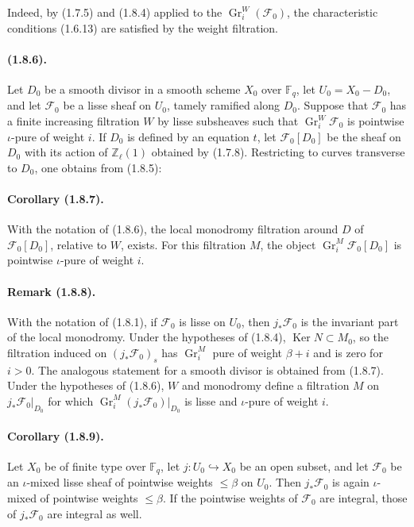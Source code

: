 \documentclass[11pt]{article}
\theoremstyle{remark}
\newcommand{\Fq}{\mathbb{F}_q}
\newcommand{\Gr}{\operatorname{Gr}}
\newcommand{\Ker}{\operatorname{Ker}}
\begin{document}
Indeed, by (1.7.5) and (1.8.4) applied to the $\Gr^W_i(\mathcal F_0)$, the characteristic conditions (1.6.13) are satisfied by the weight filtration.

\paragraph{(1.8.6).} Let $D_0$ be a smooth divisor in a smooth scheme $X_0$ over $\Fq$, let $U_0=X_0-D_0$, and let $\mathcal F_0$ be a lisse sheaf on $U_0$, tamely ramified along $D_0$. Suppose that $\mathcal F_0$ has a finite increasing filtration $W$ by lisse subsheaves such that $\Gr^W_i\mathcal F_0$ is pointwise $\iota$-pure of weight $i$. If $D_0$ is defined by an equation $t$, let $\mathcal F_0[D_0]$ be the sheaf on $D_0$ with its action of $\mathbb Z_\ell(1)$ obtained by (1.7.8). Restricting to curves transverse to $D_0$, one obtains from (1.8.5):

\paragraph{Corollary (1.8.7).} With the notation of (1.8.6), the local monodromy filtration around $D$ of $\mathcal F_0[D_0]$, relative to $W$, exists. For this filtration $M$, the object $\Gr^M_i\mathcal F_0[D_0]$ is pointwise $\iota$-pure of weight $i$.

\paragraph{Remark (1.8.8).} With the notation of (1.8.1), if $\mathcal F_0$ is lisse on $U_0$, then $j_*\mathcal F_0$ is the invariant part of the local monodromy. Under the hypotheses of (1.8.4), $\Ker N\subset M_0$, so the filtration induced on $(j_*\mathcal F_0)_s$ has $\Gr^M_i$ pure of weight $\beta+i$ and is zero for $i>0$. The analogous statement for a smooth divisor is obtained from (1.8.7). Under the hypotheses of (1.8.6), $W$ and monodromy define a filtration $M$ on $j_*\mathcal F_0|_{D_0}$ for which $\Gr^M_i(j_*\mathcal F_0)|_{D_0}$ is lisse and $\iota$-pure of weight $i$.

\paragraph{Corollary (1.8.9).} Let $X_0$ be of finite type over $\Fq$, let $j:U_0\hookrightarrow X_0$ be an open subset, and let $\mathcal F_0$ be an $\iota$-mixed lisse sheaf of pointwise weights $\le \beta$ on $U_0$. Then $j_*\mathcal F_0$ is again $\iota$-mixed of pointwise weights $\le\beta$. If the pointwise weights of $\mathcal F_0$ are integral, those of $j_*\mathcal F_0$ are integral as well.
\end{document}
